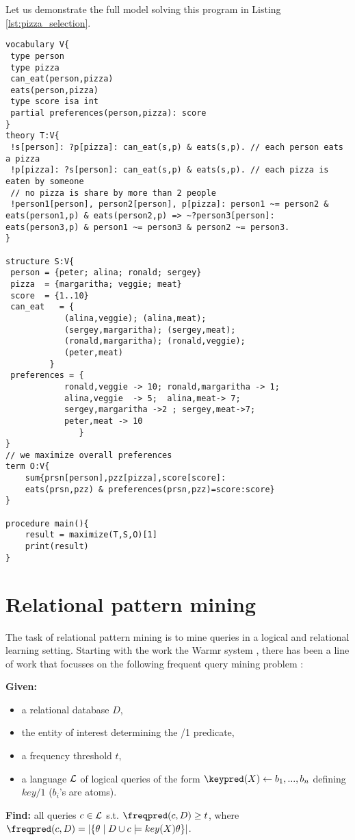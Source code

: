 Let us demonstrate the full model solving this program in Listing \ref{lst:pizza_selection}.
\begin{minipage}{\linewidth}
\begin{lstlisting}[caption=Encoding pizza selection problem, label=lst:pizza_selection,basicstyle=\ttfamily, basicstyle=\small]
vocabulary V{
 type person
 type pizza
 can_eat(person,pizza)
 eats(person,pizza)
 type score isa int
 partial preferences(person,pizza): score
}
theory T:V{
 !s[person]: ?p[pizza]: can_eat(s,p) & eats(s,p). // each person eats a pizza 
 !p[pizza]: ?s[person]: can_eat(s,p) & eats(s,p). // each pizza is eaten by someone
 // no pizza is share by more than 2 people
 !person1[person], person2[person], p[pizza]: person1 ~= person2 & eats(person1,p) & eats(person2,p) => ~?person3[person]: eats(person3,p) & person1 ~= person3 & person2 ~= person3.
}

structure S:V{
 person = {peter; alina; ronald; sergey}
 pizza  = {margaritha; veggie; meat}
 score  = {1..10}
 can_eat   = {
        	(alina,veggie); (alina,meat); 
         	(sergey,margaritha); (sergey,meat);
         	(ronald,margaritha); (ronald,veggie);
         	(peter,meat)
     	 }
 preferences = {	
            ronald,veggie -> 10; ronald,margaritha -> 1; 
            alina,veggie  -> 5;  alina,meat-> 7;
            sergey,margaritha ->2 ; sergey,meat->7;
            peter,meat -> 10
        	   }	
}
// we maximize overall preferences
term O:V{
    sum{prsn[person],pzz[pizza],score[score]: 
    eats(prsn,pzz) & preferences(prsn,pzz)=score:score}
}

procedure main(){
    result = maximize(T,S,O)[1]
    print(result)
}

\end{lstlisting}
\end{minipage}
\pubrevend


\pubrev
   \section{Relational pattern mining}
   The task of relational pattern mining is to mine queries in a logical and relational learning setting. Starting with the work the Warmr system \parencite{warmr}, there has been a line of work that focusses on the following frequent query mining problem \parencite{bagm,farmer,condensed_luc}:

   \noindent
   {\bf Given:} \vspace{-8pt}
   \begin{itemize}
   \item a relational database $D$,
   \item the entity of interest determining the \keypred/1 predicate,
   \item a frequency threshold $t$,
   \item a language ${\cal L}$ of logical queries of the form $\keypred(X) \leftarrow b_1, ..., b_n$ defining $key/1$ ($b_i$'s are atoms).
   \end{itemize}\vspace{-5pt}
   {\bf Find:} all queries $c \in {\cal L}$ s.t. $\freqpred(c,D) \geq t$, where ${\freqpred(c,D) = |\{\theta \mid D \cup c \models key(X)\theta \}|}$.

